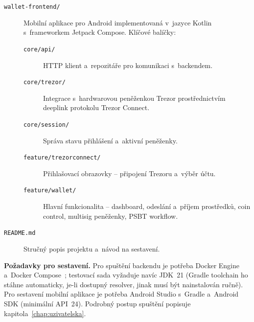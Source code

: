 \begin{description}
\item[\texttt{wallet-frontend/}] Mobilní aplikace pro Android
  implementovaná v~jazyce Kotlin s~frameworkem Jetpack Compose. Klíčové
  balíčky:

  \begin{description}
  \item[\texttt{core/api/}] HTTP klient a~repozitáře pro komunikaci
    s~backendem.
  \item[\texttt{core/trezor/}] Integrace s~hardwarovou peněženkou Trezor
    prostřednictvím deeplink protokolu Trezor Connect.
  \item[\texttt{core/session/}] Správa stavu přihlášení a~aktivní
    peněženky.
  \item[\texttt{feature/trezorconnect/}] Přihlašovací obrazovky --
    připojení Trezoru a~výběr účtu.
  \item[\texttt{feature/wallet/}] Hlavní funkcionalita -- dashboard,
    odeslání a~příjem prostředků, coin control, multisig peněženky,
    PSBT workflow.
  \end{description}

\item[\texttt{README.md}] Stručný popis projektu a~návod na sestavení.
\end{description}

\bigskip
\noindent\textbf{Požadavky pro sestavení.}
Pro spuštění backendu je potřeba Docker Engine a~Docker
Compose~\cite{Docker}; testovací sada vyžaduje navíc JDK~21 (Gradle
toolchain ho stáhne automaticky, je-li dostupný resolver, jinak
musí být nainstalován ručně). Pro sestavení mobilní aplikace je
potřeba Android Studio s~Gradle a~Android SDK (minimální API~24).
Podrobný postup spuštění popisuje kapitola~\ref{chap:uzivatelska}.
